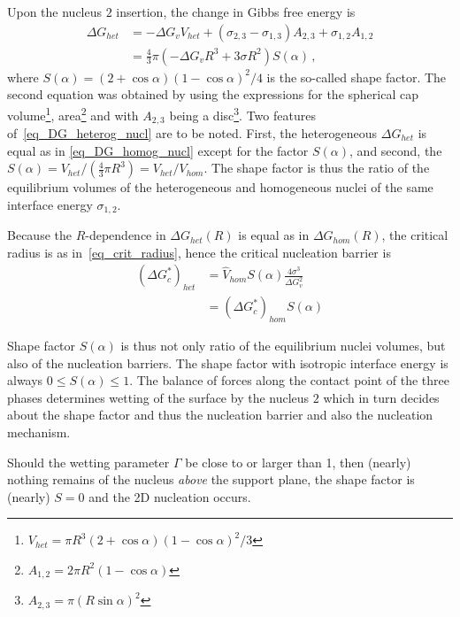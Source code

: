         Upon the nucleus $\mathit{2}$ insertion, the change in Gibbs free energy is
        \begin{align}
            \Delta G_{het} &= -\Delta G_v V_{het} + (\sigma_{2,3}-\sigma_{1,3})A_{2,3} + \sigma_{1,2}A_{1,2} \\
                &= \frac{4}{3}\pi(-\Delta G_v R^3 + 3\sigma R^2) S(\alpha) \,, \label{eq_DG_heterog_nucl}
        \end{align}
        where $S(\alpha)=(2+\cos\alpha)(1-\cos\alpha)^2/4$ is the so-called shape factor. The second equation was obtained by using the expressions for the spherical cap volume\footnote{$V_{het}=\pi R^3(2+\cos\alpha)(1-\cos\alpha)^2/3$}, area\footnote{$A_{1,2}=2\pi R^2(1-\cos\alpha)$} and with $A_{2,3}$ being a disc\footnote{$A_{2,3}=\pi(R\sin\alpha)^2$}. Two features of~\eqref{eq_DG_heterog_nucl} are to be noted. First, the heterogeneous $\Delta G_{het}$ is equal as in \eqref{eq_DG_homog_nucl} except for the factor $S(\alpha)$, and second, the $S(\alpha)=V_{het}/(\frac{4}{3}\pi R^3)=V_{het}/V_{hom}$. The shape factor is thus the ratio of the equilibrium volumes of the heterogeneous and homogeneous nuclei of the same interface energy $\sigma_{1,2}$.
        
        Because the $R$-dependence in $\Delta G_{het}(R)$ is equal as in $\Delta G_{hom}(R)$, the critical radius is as in~\eqref{eq_crit_radius}, hence the critical nucleation barrier is 
        \begin{align}
            (\Delta G^*_c)_{het} &= \hat{V}_{hom}S(\alpha)\frac{4\sigma^3}{\Delta G_v^2} \\
                &= (\Delta G^*_c)_{hom}S(\alpha)
        \end{align}
        
        Shape factor $S(\alpha)$ is thus not only ratio of the equilibrium nuclei volumes, but also of the nucleation barriers. The shape factor with isotropic interface energy is always $0\leq S(\alpha)\leq1$. The balance of forces along the contact point of the three phases determines wetting of the surface by the nucleus $\mathit{2}$ which in turn decides about the shape factor and thus the nucleation barrier and also the nucleation mechanism. 
        
        Should the wetting parameter $\Gamma$ be close to or larger than 1, then (nearly) nothing remains of the nucleus \textit{above} the support plane, the shape factor is (nearly) $S=0$ and the 2D nucleation occurs. 
    
